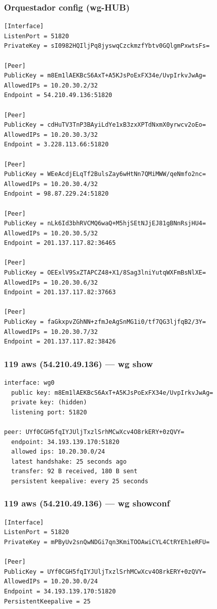 \documentclass[11pt,a4paper]{article}
\begin{document}
\subsubsection*{Orquestador config (wg-HUB)}
\begin{lstlisting}
[Interface]
ListenPort = 51820
PrivateKey = sI0982HQIljPq8jyswqCzckmzfYbtv0GQlgmPxwtsFs=

[Peer]
PublicKey = m8Em1lAEKBcS6AxT+A5KJsPoExFX34e/UvpIrkvJwAg=
AllowedIPs = 10.20.30.2/32
Endpoint = 54.210.49.136:51820

[Peer]
PublicKey = cdHuTV3TnP3BAyiLdYe1xB3zxXPTdNxmX0yrwcv2oEo=
AllowedIPs = 10.20.30.3/32
Endpoint = 3.228.113.66:51820

[Peer]
PublicKey = WEeAcdjELqTf2BulsZay6wHtNn7QMiMWW/qeNmfo2nc=
AllowedIPs = 10.20.30.4/32
Endpoint = 98.87.229.24:51820

[Peer]
PublicKey = nLk6Id3bhRVCMQ6waQ+M5hjSEtNJjEJ81gBNnRsjHU4=
AllowedIPs = 10.20.30.5/32
Endpoint = 201.137.117.82:36465

[Peer]
PublicKey = OEExlV9SxZTAPCZ48+X1/8Sag3lniYutqWXFmBsNlXE=
AllowedIPs = 10.20.30.6/32
Endpoint = 201.137.117.82:37663

[Peer]
PublicKey = faGkxpvZGhNN+zfmJeAgSnMG1i0/tf7QG3ljfqB2/3Y=
AllowedIPs = 10.20.30.7/32
Endpoint = 201.137.117.82:38426

\end{lstlisting}

\subsubsection*{119 aws (54.210.49.136) — wg show}
\begin{lstlisting}
interface: wg0
  public key: m8Em1lAEKBcS6AxT+A5KJsPoExFX34e/UvpIrkvJwAg=
  private key: (hidden)
  listening port: 51820

peer: UYf0CGH5fqIYJUljTxzlSrhMCwXcv4O8rkERY+0zQVY=
  endpoint: 34.193.139.170:51820
  allowed ips: 10.20.30.0/24
  latest handshake: 25 seconds ago
  transfer: 92 B received, 180 B sent
  persistent keepalive: every 25 seconds

\end{lstlisting}

\subsubsection*{119 aws (54.210.49.136) — wg showconf}
\begin{lstlisting}
[Interface]
ListenPort = 51820
PrivateKey = mPByUv2snQwNDGi7qn3KmiTOOAwiCYL4CtRYEh1eRFU=

[Peer]
PublicKey = UYf0CGH5fqIYJUljTxzlSrhMCwXcv4O8rkERY+0zQVY=
AllowedIPs = 10.20.30.0/24
Endpoint = 34.193.139.170:51820
PersistentKeepalive = 25

\end{lstlisting}
\end{document}

